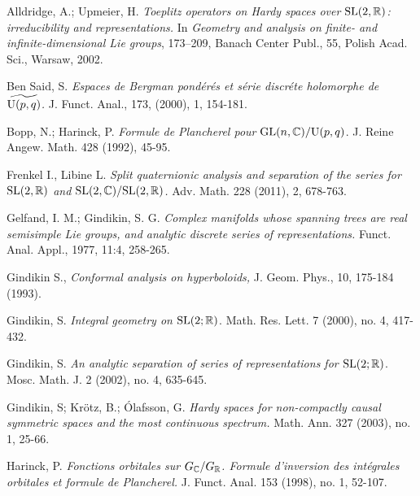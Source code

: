 \documentclass{article}
\begin{document}
\begin{thebibliography}{cc}

Alldridge, A.; Upmeier, H.
{\it Toeplitz operators on Hardy spaces over $\mathrm {SL}(2,{\mathbb R })$: irreducibility and representations.} In
{\it Geometry and analysis on finite- and infinite-dimensional Lie groups}, 173--209,
Banach Center Publ., 55, Polish Acad. Sci., Warsaw, 2002. 

	Ben Said, S.
	{\it	Espaces de Bergman pond\'er\'es et s\'erie discr\'ete holomorphe de $\widetilde{\mathrm U(p,q)}$.}
		J. Funct. Anal.,
		173,   (2000), 1,  154-181.

Bopp, N.; Harinck, P. {\it  Formule de Plancherel pour $\mathrm {GL}(n,{\mathbb C })/\mathrm U(p,q)$}. 
  J. Reine Angew. Math. 428 (1992), 45-95.
  
  	Frenkel I., Libine L.
  	{\it Split quaternionic analysis and separation of the series for $\mathrm {SL}(2,{\mathbb R })$ and 
  	$\mathrm {SL}(2,{\mathbb C })/\mathrm {SL}(2,{\mathbb R })$.}
  		Adv.  Math.
  		228 (2011), 2, 678-763.

 Gelfand, I. M.; Gindikin, S. G. {\it Complex manifolds whose spanning trees are real semisimple Lie groups,
 and analytic discrete series of representations.}
 Funct. Anal.  Appl., 1977, 11:4, 258-265.
 


 
 Gindikin S., {\it Conformal analysis on hyperboloids,} J. Geom. Phys., 10, 175-184 (1993). 
 
Gindikin, S.
{\it Integral geometry on $\mathrm {SL}(2;{\mathbb R })$}. 
Math. Res. Lett. 7 (2000), no. 4, 417-432. 

Gindikin, S. {\it  An analytic separation of series of representations for $\mathrm {SL}(2;{\mathbb R })$}.
Mosc. Math. J. 2 (2002), no. 4, 635-645.
 
 Gindikin, S; Kr\"otz, B.; \'Olafsson, G.
 {\it Hardy spaces for non-compactly causal symmetric spaces and the most continuous spectrum.}
 Math. Ann. 327 (2003), no. 1, 25-66.

  Harinck, P. {\it Fonctions orbitales sur $G_{\mathbb C }/G_{\mathbb R }$. Formule d'inversion des int\'egrales 
  orbitales et formule de Plancherel.}
  J. Funct. Anal. 153 (1998), no. 1, 52-107.
 

\end{thebibliography}
\end{document}
